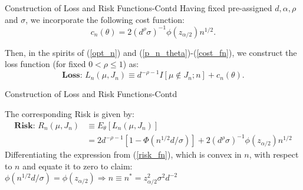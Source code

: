\documentclass [xcolor=svgnames, t] {beamer}
\begin{document}
\begin{frame}{Construction of Loss and Risk Functions-Contd}
\vspace{5mm}
Having fixed pre-assigned $d,\alpha,\rho$ and $\sigma$, we incorporate the 
following cost function:
        \begin{equation} \label{cost_fn}
        c_n(\theta) = 2(d^\rho \sigma)^{-1} \phi(z_{\alpha/2})n^{1/2}.
        \end{equation}
        
         \vspace{0.2cm}
Then, in the spirits of (\ref{opt_n}) and (\ref{p_n_theta})-(\ref{cost_fn}), we construct the loss function (for fixed $0<\rho \le 1$) as:
        \begin{equation} \label{loss2}
            \textbf{Loss: }L_n(\mu,J_n) \equiv d^{-\rho-1}I[\mu \not\in J_n;n]+c_n(\theta).
        \end{equation}

\end{frame}

\begin{frame}{Construction of Loss and Risk Functions-Contd}
  \vspace{5mm}

The corresponding Risk is given by:
    \begin{equation} \label{risk_fn}
    \begin{split}
        \textbf{Risk: } R_n(\mu,J_n)  
        & \equiv E_{\theta}[L_n(\mu,J_n)] \\ 
        &= 2d^{-\rho-1}[1-\Phi(n^{1/2}d/\sigma)]+2(d^{\rho}\sigma)^{-1}\phi(z_{\alpha/2})n^{1/2} 
    \end{split}
    \end{equation}
    \vspace{0.2cm}
Differentiating the expression from (\ref{risk_fn}), 
which is convex in $n$, with respect to $n$ and equate it to zero to claim:\\
    \vspace{0.1cm}
    $ \phi(n^{1/2}d/\sigma)=\phi(z_{\alpha/2}) \Rightarrow  n \equiv n^*=z^2_{\alpha/2}\sigma^2d^{-2}$
    
\end{frame}
\end{document}
